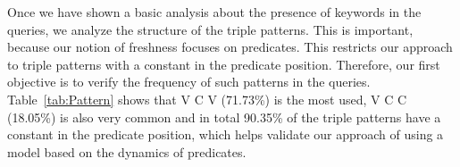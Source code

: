 \documentclass[runningheads]{llncs}
\begin{document}
\begin{table}[h]
	\centering
	\caption{Keyword count in queries.}
	\label{tab:Keyword}
\end{table}

Once we have shown a basic analysis about the presence of keywords in the queries, we analyze the structure of the triple patterns. This is important, because our notion of freshness focuses on predicates. This restricts our approach to triple patterns with a constant in the predicate position. Therefore, our first objective is to verify the frequency of such patterns in the queries. Table~\ref{tab:Pattern} shows that V C V (71.73\%) is the most used, V C C (18.05\%) is also very common and in total 90.35\% of the triple patterns have a constant in the predicate position, which helps validate our approach of using a model based on the dynamics of predicates.
\end{document}
